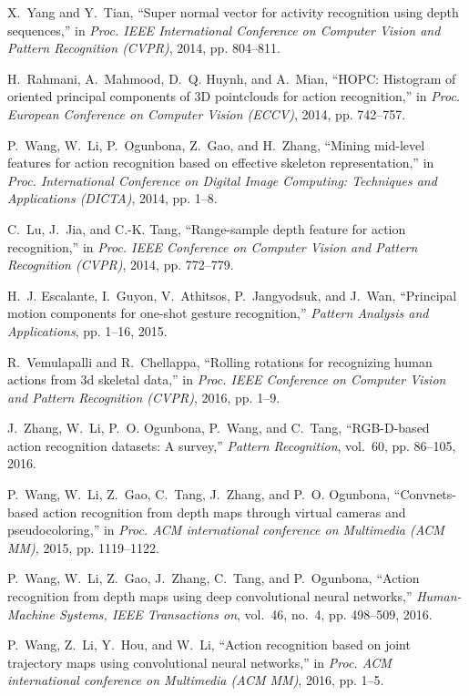 \documentclass[10pt, a4paper, conference]{IEEEtran}
\begin{document}
\begin{thebibliography}{10}
X.~Yang and Y.~Tian, ``Super normal vector for activity recognition using depth
  sequences,'' in \emph{Proc. IEEE International Conference on Computer Vision
  and Pattern Recognition (CVPR)}, 2014, pp. 804--811.

H.~Rahmani, A.~Mahmood, D.~Q. Huynh, and A.~Mian, ``{HOPC}: Histogram of
  oriented principal components of {3D} pointclouds for action recognition,''
  in \emph{Proc. European Conference on Computer Vision (ECCV)}, 2014, pp.
  742--757.

P.~Wang, W.~Li, P.~Ogunbona, Z.~Gao, and H.~Zhang, ``Mining mid-level features
  for action recognition based on effective skeleton representation,'' in
  \emph{Proc. International Conference on Digital Image Computing: Techniques
  and Applications (DICTA)}, 2014, pp. 1--8.

C.~Lu, J.~Jia, and C.-K. Tang, ``Range-sample depth feature for action
  recognition,'' in \emph{Proc. IEEE Conference on Computer Vision and Pattern
  Recognition (CVPR)}, 2014, pp. 772--779.

H.~J. Escalante, I.~Guyon, V.~Athitsos, P.~Jangyodsuk, and J.~Wan, ``Principal
  motion components for one-shot gesture recognition,'' \emph{Pattern Analysis
  and Applications}, pp. 1--16, 2015.

R.~Vemulapalli and R.~Chellappa, ``Rolling rotations for recognizing human
  actions from 3d skeletal data,'' in \emph{Proc. IEEE Conference on Computer
  Vision and Pattern Recognition (CVPR)}, 2016, pp. 1--9.

J.~Zhang, W.~Li, P.~O. Ogunbona, P.~Wang, and C.~Tang, ``{RGB-D}-based action
  recognition datasets: A survey,'' \emph{Pattern Recognition}, vol.~60, pp.
  86--105, 2016.

P.~Wang, W.~Li, Z.~Gao, C.~Tang, J.~Zhang, and P.~O. Ogunbona, ``Convnets-based
  action recognition from depth maps through virtual cameras and
  pseudocoloring,'' in \emph{Proc. ACM international conference on Multimedia
  (ACM MM)}, 2015, pp. 1119--1122.

P.~Wang, W.~Li, Z.~Gao, J.~Zhang, C.~Tang, and P.~Ogunbona, ``Action
  recognition from depth maps using deep convolutional neural networks,''
  \emph{Human-Machine Systems, IEEE Transactions on}, vol.~46, no.~4, pp.
  498--509, 2016.

P.~Wang, Z.~Li, Y.~Hou, and W.~Li, ``Action recognition based on joint
  trajectory maps using convolutional neural networks,'' in \emph{Proc. ACM
  international conference on Multimedia (ACM MM)}, 2016, pp. 1--5.


\end{thebibliography}
\end{document}
